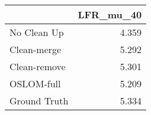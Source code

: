 \begin{tabular}{lr}
\toprule
{} & LFR_mu_40 \\
\midrule
No Clean Up  &     4.359 \\
Clean-merge  &     5.292 \\
Clean-remove &     5.301 \\
OSLOM-full   &     5.209 \\
Ground Truth &     5.334 \\
\bottomrule
\end{tabular}
